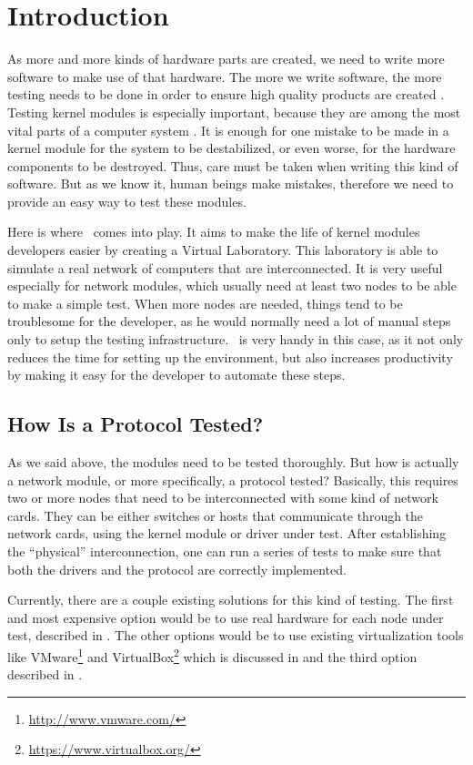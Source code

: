 \chapter{Introduction}
\label{chapter:intro}

As more and more kinds of hardware parts are created, we need to write more software to make use of that hardware.
The more we write software, the more testing needs to be done in order to ensure high quality products are created \cite{myers11}.
Testing kernel modules is especially important, because they are among the most vital parts of a computer system \cite{bligh06}.
It is enough for one mistake to be made in a kernel module for the system to be
destabilized, or even worse, for the hardware components to be destroyed.
Thus, care must be taken when writing this kind of software.
But as we know it, human beings make mistakes, therefore we need to provide an easy way to test these modules.

Here is where \project\ comes into play.
It aims to make the life of kernel modules developers easier by creating a Virtual Laboratory.
This laboratory is able to simulate a real network of computers that are interconnected.
It is very useful especially for network modules, which usually need at least two nodes to be able to make a simple test.
When more nodes are needed, things tend to be troublesome for the developer, as he would normally need a lot of manual steps only to setup the testing infrastructure.
\project\ is very handy in this case, as it not only reduces the time for setting up the environment, but also increases productivity by making it easy for the developer to automate these steps.

\section{How Is a Protocol Tested?}
\label{sec:proto-testing}

As we said above, the modules need to be tested thoroughly. But how is actually a network module, or more specifically, a protocol tested?
Basically, this requires two or more nodes that need to be interconnected with some kind of network cards.
They can be either switches or hosts that communicate through the network cards, using the kernel module or driver under test.
After establishing the ``physical'' interconnection, one can run a series of tests to make sure that both the drivers and the protocol are correctly implemented.

Currently, there are a couple existing solutions for this kind of testing.
The first and most expensive option would be to use real hardware for each node under test, described in .
The other options would be to use existing virtualization tools like VMware\footnote{\url{http://www.vmware.com/}} and VirtualBox\footnote{\url{https://www.virtualbox.org/}} which is discussed in  and the third option described in .

